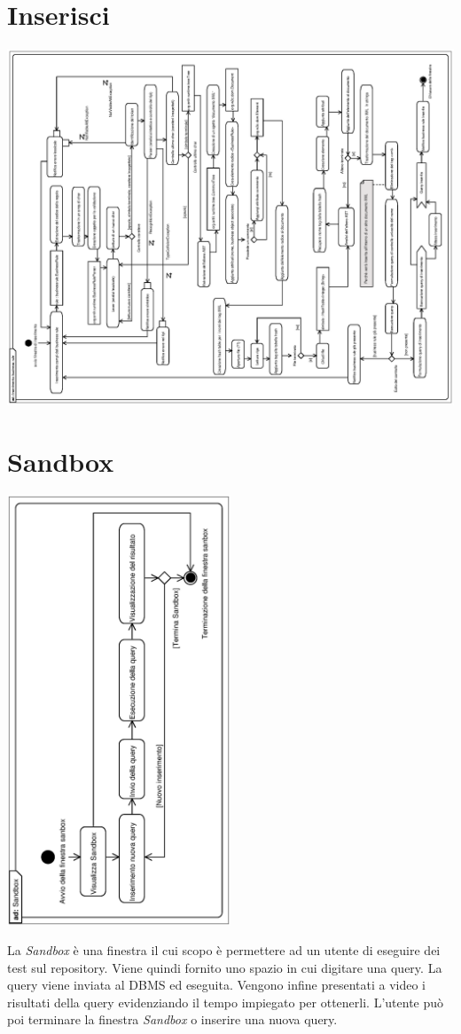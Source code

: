 \documentclass[11pt,titlepage,a4paper]{report}
\begin{document}
\section{Inserisci \br}
\begin{center}
 \includegraphics[width=1.4\textwidth, angle=-90]{InserisciBusinessRule2.eps}
\end{center}


\section{Sandbox}
\begin{center}
 \includegraphics[width=0.5\textwidth, angle=-90]{Sandbox.eps}
\end{center}
La \textit{Sandbox} \`e una finestra il cui scopo \`e permettere ad un utente di eseguire dei test sul repository. Viene quindi fornito uno spazio in cui digitare una query. La query viene inviata al DBMS ed eseguita. Vengono infine presentati a video i risultati della query evidenziando il tempo impiegato per ottenerli. L'utente pu\`o poi terminare la finestra \textit{Sandbox} o inserire una nuova query.
\end{document}
